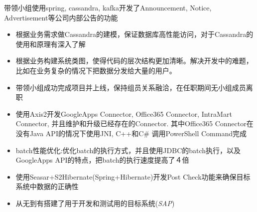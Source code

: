 \documentclass{resume}
\begin{document}
\begin{onehalfspacing}
带领小组使用spring, cassandra, kafka开发了Announcement, Notice, Advertisement等公司内部公告的功能
\begin{itemize}
  \item 根据业务需求做Cassandra的建模，保证数据库高性能访问，对于Cassandra的使用和原理有深入了解
  \item 根据业务构建系统类图，使得代码的层次结构更加清晰。解决开发中的难题，比如在业务复杂的情况下把数据分发给大量的用户。
  \item 带领小组成功完成项目并上线，保持组员关系融洽，在任职期间无小组成员离职
\end{itemize}
\end{onehalfspacing}

\begin{itemize}
  \item 使用Axis2开发GoogleApps Connector, Office365 Connector, IntraMart Connector, 并且维护和升级已经存在的Connector. 其中Office365 Connector在没有Java API的情况下使用JNI, C++和C\# 调用PowerShell Command完成
  \item batch性能优化:优化batch的执行方式，并且使用JDBC的batch执行，以及GoogleApps API的特点，把batch的执行速度提高了４倍
  \item 使用Seasar+S2Hibernate(Spring+Hibernate)开发Post Check功能来确保目标系统中数据的正确性
  \item 从无到有搭建了用于开发和测试用的目标系统(\textit{SAP})
\end{itemize}





%
%
\end{document}
